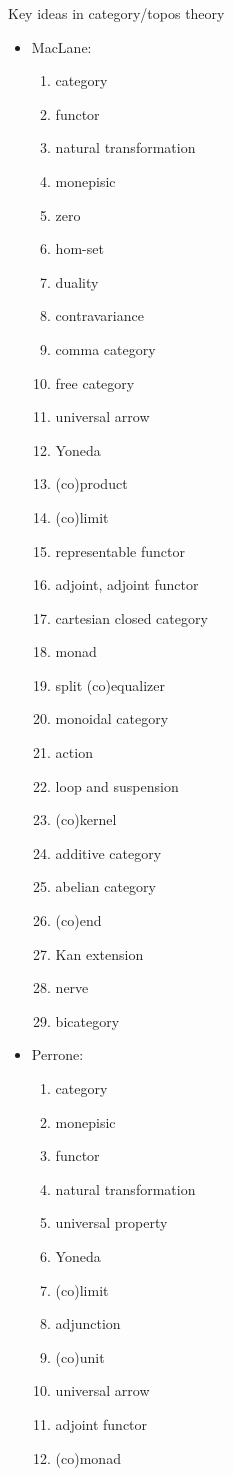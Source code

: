 \begin{plSection}{Key ideas in category/topos theory}
\begin{itemize}
\item MacLane:~\cite{MacLane:1998:CategoriesWorking2}
\begin{enumerate}
  \item category
  \item functor
  \item natural transformation
  \item monepisic
  \item zero
  \item hom-set
  \item duality
  \item contravariance
  \item comma category
  \item free category
  \item universal arrow
  \item Yoneda
  \item (co)product
  \item (co)limit
  \item representable functor
  \item adjoint, adjoint functor
  \item cartesian closed category
  \item monad
  \item split (co)equalizer
  \item monoidal category
  \item action
  \item loop and suspension
  \item (co)kernel
  \item additive category
  \item abelian category
  \item (co)end
  \item Kan extension
  \item nerve
  \item bicategory
\end{enumerate}

\item Perrone:~\cite{Perrone:2019:CatTheory}
\begin{enumerate}
  \item category
  \item monepisic
  \item functor
  \item natural transformation
  \item universal property
  \item Yoneda
  \item (co)limit
  \item adjunction
  \item (co)unit
  \item universal arrow
  \item adjoint functor
  \item (co)monad
\end{enumerate}


\end{itemize}
\end{plSection}
